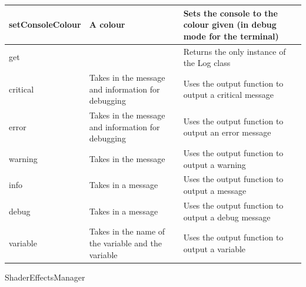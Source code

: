 \documentclass[../../Main.tex]{subfiles}
\begin{document}
\begin{center}
\begin{tabular}{ | m{} | m{}| m{} | }
            \hline
            setConsoleColour & A colour & Sets the console to the colour given (in debug mode for the terminal) \\
            \hline
            get & & Returns the only instance of the Log class \\
            \hline
            critical & Takes in the message and information for debugging & Uses the output function to output a critical message \\
            \hline
            error & Takes in the message and information for debugging & Uses the output function to output an error message \\
            \hline
            warning & Takes in the message & Uses the output function to output a warning \\
            \hline
            info & Takes in a message & Uses the output function to output a message \\
            \hline
            debug & Takes in a message & Uses the output function to output a debug message \\
            \hline
            variable & Takes in the name of the variable and the variable & Uses the output function to output a variable \\
            \hline
        \end{tabular}
    \end{center}
    ShaderEffectsManager
\end{document}
